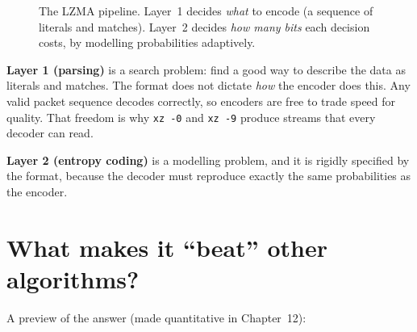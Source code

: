 \documentclass[11pt,a4paper,oneside]{book}
\begin{document}
\begin{figure}[ht]
\centering
{}
\caption{The LZMA pipeline. Layer~1 decides \emph{what} to encode (a sequence of literals and matches).
Layer~2 decides \emph{how many bits} each decision costs, by modelling probabilities adaptively.}
\label{fig:pipeline}
\end{figure}

\textbf{Layer 1 (parsing)} is a search problem: find a good way to describe the data as literals and matches.
The format does not dictate \emph{how} the encoder does this. Any valid packet sequence decodes correctly, so encoders
are free to trade speed for quality. That freedom is why \texttt{xz -0} and \texttt{xz -9} produce
streams that every decoder can read.

\textbf{Layer 2 (entropy coding)} is a modelling problem, and it is rigidly specified by the format, because the
decoder must reproduce exactly the same probabilities as the encoder.

\section{What makes it ``beat'' other algorithms?}

A preview of the answer (made quantitative in Chapter~12):
\end{document}
